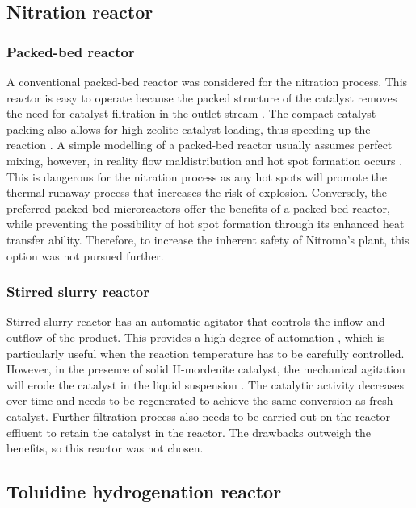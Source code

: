 \subsection{Nitration reactor}
\label{nitrationreactor}
\subsubsection{Packed-bed reactor}
A conventional packed-bed reactor was considered for the nitration process. This reactor is easy to operate because the packed structure of the catalyst removes the need for catalyst filtration in the outlet stream . The compact catalyst packing also allows for high zeolite catalyst loading, thus speeding up the reaction \cite{kashid_microstructured_2009}. A simple modelling of a packed-bed reactor usually assumes perfect mixing, however, in reality flow maldistribution and hot spot formation occurs \cite{nguyen_flow_1994}. This is dangerous for the nitration process as any hot spots will promote the thermal runaway process that increases the risk of explosion. Conversely, the preferred packed-bed microreactors offer the benefits of a packed-bed reactor, while preventing the possibility of hot spot formation through its enhanced heat transfer ability. Therefore, to increase the inherent safety of Nitroma's plant, this option was not pursued further.

\subsubsection{Stirred slurry reactor}
Stirred slurry reactor has an automatic agitator that controls the inflow and outflow of the product. This provides a high degree of automation \cite{liu_nitration_2019}, which is particularly useful when the reaction temperature has to be carefully controlled. However, in the presence of solid H-mordenite catalyst, the mechanical agitation will erode the catalyst in the liquid suspension \cite{argyle_heterogeneous_2015}. The catalytic activity decreases over time and needs to be regenerated to achieve the same conversion as fresh catalyst. Further filtration process also needs to be carried out on the reactor effluent to retain the catalyst in the reactor. The drawbacks outweigh the benefits, so this reactor was not chosen.

\subsection{Toluidine hydrogenation reactor}

